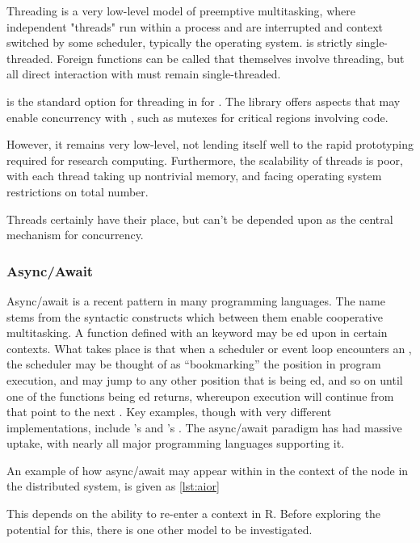 Threading is a very low-level model of preemptive multitasking, where independent "threads" run within a process and are interrupted and context switched by some scheduler, typically the operating system.
\R is strictly single-threaded.
Foreign  functions can be called that themselves involve threading, but all direct interaction with \R must remain single-threaded.

\cite{nichols1996pthreads} is the standard option for threading in  for \R.
The library offers aspects that may enable concurrency with \R, such as mutexes for critical regions involving \R code.

However, it remains very low-level, not lending itself well to the rapid prototyping required for research computing.
Furthermore, the scalability of threads is poor, with each thread taking up nontrivial memory, and facing operating system restrictions on total number.

Threads certainly have their place, but can't be depended upon as the central mechanism for concurrency.

\subsubsection{Async/Await}

Async/await is a recent pattern in many programming languages.
The name stems from the syntactic constructs which between them enable cooperative multitasking.
A function defined with an  keyword may be ed upon in certain contexts.
What takes place is that when a scheduler or event loop encounters an , the scheduler may be thought of as ``bookmarking'' the position in program execution, and may jump to any other position that is being ed, and so on until one of the functions being ed returns, whereupon execution will continue from that point to the next .
Key examples, though with very different implementations, include 's  and 's .
The async/await paradigm has had massive uptake, with nearly all major programming languages supporting it.

An example of how async/await may appear within \R in the context of the node in the distributed system, is given as \cref{lst:aior}


This depends on the ability to re-enter a context in R.
Before exploring the potential for this, there is one other model to be investigated.

